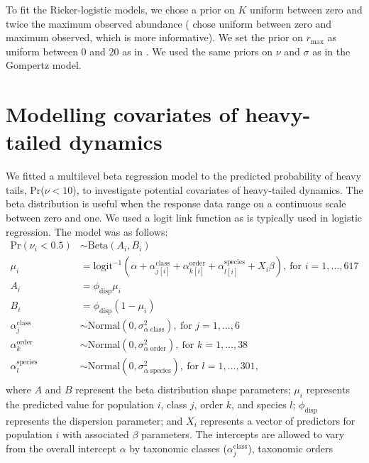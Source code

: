To fit the Ricker-logistic models, we chose a prior on $K$ uniform between zero
and twice the maximum observed abundance (\citet{clark2010} chose uniform
between zero and maximum observed, which is more informative). We set the prior
on $r_\mathrm{max}$ as uniform between 0 and 20 as in \citet{clark2010}. We used
the same priors on $\nu$ and $\sigma$ as in the Gompertz model.

\section{Modelling covariates of heavy-tailed dynamics}

We fitted a multilevel beta regression model to the predicted probability of
heavy tails, Pr($\nu < 10$), to investigate potential covariates of heavy-tailed
dynamics. The beta distribution is useful when the response data range on
a continuous scale between zero and one. We used a logit link function as is
typically used in logistic regression. The model was as follows:
\begin{align*}
\mathrm{Pr}(\nu_i < 0.5) &\sim \mathrm{Beta}(A_i, B_i)\\
\mu_i &= \mathrm{logit}^{-1}(\alpha
  + \alpha^\mathrm{class}_{j[i]}
  + \alpha^\mathrm{order}_{k[i]}
  + \alpha^\mathrm{species}_{l[i]}
  + X_i \beta),
  \: \text{for } i = 1, \dots, 617\\
A_i &= \phi_\mathrm{disp} \mu_i\\
B_i &= \phi_\mathrm{disp} (1 - \mu_i)\\
\alpha^\mathrm{class}_j &\sim
  \mathrm{Normal}(0, \sigma^2_{\alpha \; \mathrm{class}}),
  \: \text{for } j = 1, \dots, 6\\
\alpha^\mathrm{order}_k &\sim
  \mathrm{Normal}(0, \sigma^2_{\alpha \; \mathrm{order}}),
  \: \text{for } k = 1, \dots, 38\\
\alpha^\mathrm{species}_l &\sim
  \mathrm{Normal}(0, \sigma^2_{\alpha \; \mathrm{species}}),
  \: \text{for } l = 1, \dots, 301,\\
\end{align*}
where $A$ and $B$ represent the beta distribution shape parameters; $\mu_i$
represents the predicted value for population $i$, class $j$, order $k$, and
species $l$; $\phi_\mathrm{disp}$ represents the dispersion parameter; and $X_i$
represents a vector of predictors for population $i$ with associated $\beta$
parameters. The intercepts are allowed to vary from the overall intercept
$\alpha$ by taxonomic classes ($\alpha^\mathrm{class}_j$), taxonomic orders

